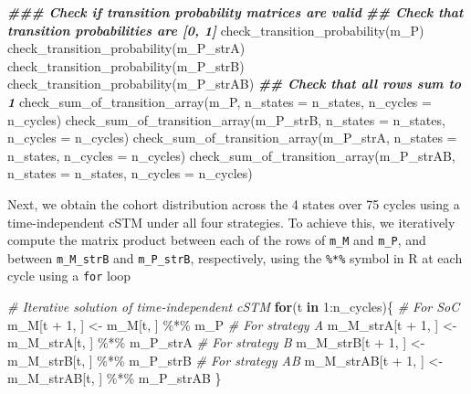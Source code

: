 \documentclass[
]{article}
\newenvironment{Shaded}{\begin{snugshade}}{\end{snugshade}}
\newcommand{\AttributeTok}[1]{\textcolor[rgb]{0.77,0.63,0.00}{#1}}
\newcommand{\CommentTok}[1]{\textcolor[rgb]{0.56,0.35,0.01}{\textit{#1}}}
\newcommand{\ControlFlowTok}[1]{\textcolor[rgb]{0.13,0.29,0.53}{\textbf{#1}}}
\newcommand{\DecValTok}[1]{\textcolor[rgb]{0.00,0.00,0.81}{#1}}
\newcommand{\DocumentationTok}[1]{\textcolor[rgb]{0.56,0.35,0.01}{\textbf{\textit{#1}}}}
\newcommand{\FunctionTok}[1]{\textcolor[rgb]{0.00,0.00,0.00}{#1}}
\newcommand{\NormalTok}[1]{#1}
\newcommand{\OtherTok}[1]{\textcolor[rgb]{0.56,0.35,0.01}{#1}}
\newcommand{\SpecialCharTok}[1]{\textcolor[rgb]{0.00,0.00,0.00}{#1}}
\begin{document}
\begin{Shaded}
\begin{Highlighting}[]
\DocumentationTok{\#\#\# Check if transition probability matrices are valid}
\DocumentationTok{\#\# Check that transition probabilities are [0, 1]}
\FunctionTok{check\_transition\_probability}\NormalTok{(m\_P)}
\FunctionTok{check\_transition\_probability}\NormalTok{(m\_P\_strA)}
\FunctionTok{check\_transition\_probability}\NormalTok{(m\_P\_strB)}
\FunctionTok{check\_transition\_probability}\NormalTok{(m\_P\_strAB)}
\DocumentationTok{\#\# Check that all rows sum to 1}
\FunctionTok{check\_sum\_of\_transition\_array}\NormalTok{(m\_P,      }\AttributeTok{n\_states =}\NormalTok{ n\_states, }\AttributeTok{n\_cycles =}\NormalTok{ n\_cycles)}
\FunctionTok{check\_sum\_of\_transition\_array}\NormalTok{(m\_P\_strB, }\AttributeTok{n\_states =}\NormalTok{ n\_states, }\AttributeTok{n\_cycles =}\NormalTok{ n\_cycles)}
\FunctionTok{check\_sum\_of\_transition\_array}\NormalTok{(m\_P\_strA, }\AttributeTok{n\_states =}\NormalTok{ n\_states, }\AttributeTok{n\_cycles =}\NormalTok{ n\_cycles)}
\FunctionTok{check\_sum\_of\_transition\_array}\NormalTok{(m\_P\_strAB, }\AttributeTok{n\_states =}\NormalTok{ n\_states, }\AttributeTok{n\_cycles =}\NormalTok{ n\_cycles)}
\end{Highlighting}
\end{Shaded}

Next, we obtain the cohort distribution across the 4 states over 75 cycles using a time-independent cSTM under all four strategies. To achieve this, we iteratively compute the matrix product between each of the rows of \texttt{m\_M} and \texttt{m\_P}, and between \texttt{m\_M\_strB} and \texttt{m\_P\_strB}, respectively, using the \texttt{\%*\%} symbol in R at each cycle using a \texttt{for} loop

\begin{Shaded}
\begin{Highlighting}[]
\CommentTok{\# Iterative solution of time{-}independent cSTM}
\ControlFlowTok{for}\NormalTok{(t }\ControlFlowTok{in} \DecValTok{1}\SpecialCharTok{:}\NormalTok{n\_cycles)\{}
  \CommentTok{\# For SoC}
\NormalTok{  m\_M[t }\SpecialCharTok{+} \DecValTok{1}\NormalTok{, ] }\OtherTok{\textless{}{-}}\NormalTok{ m\_M[t, ] }\SpecialCharTok{\%*\%}\NormalTok{ m\_P}
  \CommentTok{\# For strategy A}
\NormalTok{  m\_M\_strA[t }\SpecialCharTok{+} \DecValTok{1}\NormalTok{, ] }\OtherTok{\textless{}{-}}\NormalTok{ m\_M\_strA[t, ] }\SpecialCharTok{\%*\%}\NormalTok{ m\_P\_strA}
  \CommentTok{\# For strategy B}
\NormalTok{  m\_M\_strB[t }\SpecialCharTok{+} \DecValTok{1}\NormalTok{, ] }\OtherTok{\textless{}{-}}\NormalTok{ m\_M\_strB[t, ] }\SpecialCharTok{\%*\%}\NormalTok{ m\_P\_strB}
  \CommentTok{\# For strategy AB}
\NormalTok{  m\_M\_strAB[t }\SpecialCharTok{+} \DecValTok{1}\NormalTok{, ] }\OtherTok{\textless{}{-}}\NormalTok{ m\_M\_strAB[t, ] }\SpecialCharTok{\%*\%}\NormalTok{ m\_P\_strAB}
\NormalTok{\}}
\end{Highlighting}
\end{Shaded}
\end{document}
